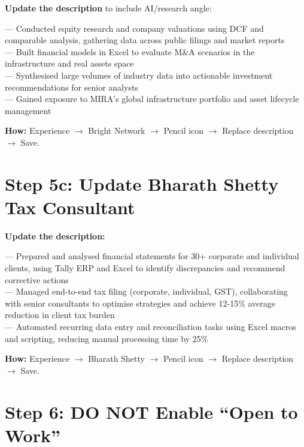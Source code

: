 \documentclass[11pt,a4paper]{article}
\begin{document}
\textbf{Update the description} to include AI/research angle:

\begin{copybox}
--- Conducted equity research and company valuations using DCF and comparable analysis, gathering data across public filings and market reports\\
--- Built financial models in Excel to evaluate M\&A scenarios in the infrastructure and real assets space\\
--- Synthesised large volumes of industry data into actionable investment recommendations for senior analysts\\
--- Gained exposure to MIRA's global infrastructure portfolio and asset lifecycle management
\end{copybox}

\textbf{How:} Experience $\rightarrow$ Bright Network $\rightarrow$ Pencil icon $\rightarrow$ Replace description $\rightarrow$ Save.

\section{Step 5c: Update Bharath Shetty Tax Consultant}

\textbf{Update the description:}

\begin{copybox}
--- Prepared and analysed financial statements for 30+ corporate and individual clients, using Tally ERP and Excel to identify discrepancies and recommend corrective actions\\
--- Managed end-to-end tax filing (corporate, individual, GST), collaborating with senior consultants to optimise strategies and achieve 12-15\% average reduction in client tax burden\\
--- Automated recurring data entry and reconciliation tasks using Excel macros and scripting, reducing manual processing time by 25\%
\end{copybox}

\textbf{How:} Experience $\rightarrow$ Bharath Shetty $\rightarrow$ Pencil icon $\rightarrow$ Replace description $\rightarrow$ Save.

\section{Step 6: DO NOT Enable ``Open to Work''}
\end{document}
